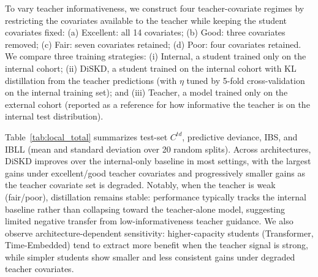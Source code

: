 \documentclass{article}
\theoremstyle{plain}
\theoremstyle{definition}
\theoremstyle{remark}
\begin{document}
To vary teacher informativeness, we construct four teacher-covariate regimes by restricting the covariates available to the teacher while keeping the student covariates fixed:
(a) Excellent: all 14 covariates; 
(b) Good: three covariates removed; 
(c) Fair: seven covariates retained; 
(d) Poor: four covariates retained. 
We compare three training strategies: (i) Internal, a student trained only on the internal cohort; (ii) DiSKD, a student trained on the internal cohort with KL distillation from the teacher predictions (with $\eta$ tuned by 5-fold cross-validation on the internal training set); and (iii) Teacher, a model trained only on the external cohort (reported as a reference for how informative the teacher is on the internal test distribution).

Table~\ref{tab:local_total} summarizes test-set $C^{td}$, predictive deviance, IBS, and IBLL (mean and standard deviation over 20 random splits). 
Across architectures, DiSKD improves over the internal-only baseline in most settings, with the largest gains under excellent/good teacher covariates and progressively smaller gains as the teacher covariate set is degraded. 
Notably, when the teacher is weak (fair/poor), distillation remains stable: performance typically tracks the internal baseline rather than collapsing toward the teacher-alone model, suggesting limited negative transfer from low-informativeness teacher guidance.
We also observe architecture-dependent sensitivity: higher-capacity students (Transformer, Time-Embedded) tend to extract more benefit when the teacher signal is strong, while simpler students show smaller and less consistent gains under degraded teacher covariates.
\end{document}
